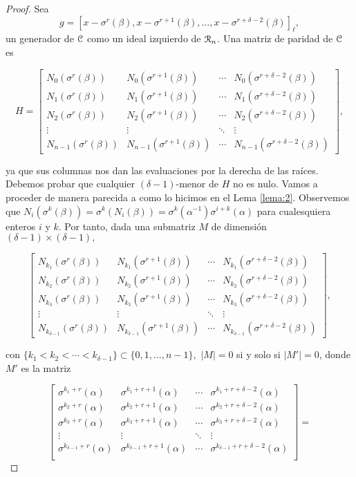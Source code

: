 \begin{proof}
Sea $$g = [x - \sigma^r(\beta), x - \sigma^{r+1}(\beta),\dots,x - \sigma^{r + \delta - 2}(\beta)]_\ell,$$
un generador de $\mathcal C$ como un ideal izquierdo de $\mathcal R_n$. Una matriz de paridad de $\mathcal C$ es

\[ H = 
\begin{bmatrix}
N_0(\sigma^r(\beta)) & N_0(\sigma^{r+1}(\beta)) & \cdots & N_0(\sigma^{r+\delta-2}(\beta)) \\
N_1(\sigma^r(\beta)) & N_1(\sigma^{r+1}(\beta)) & \cdots & N_1(\sigma^{r+\delta-2}(\beta)) \\
N_2(\sigma^r(\beta)) & N_2(\sigma^{r+1}(\beta)) & \cdots & N_2(\sigma^{r+\delta-2}(\beta)) \\
\vdots & \vdots & \ddots & \vdots \\
N_{n-1}(\sigma^r(\beta)) & N_{n-1}(\sigma^{r+1}(\beta)) & \cdots & N_{n-1}(\sigma^{r+\delta-2}(\beta))
\end{bmatrix},
\]

ya que sus columnas nos dan las evaluaciones por la derecha de las raíces. Debemos probar que cualquier $(\delta - 1)$-menor de $H$ no es nulo. Vamos a proceder de manera parecida a como lo hicimos en el Lema \ref{lema:2}. Observemos que $N_i(\sigma^k(\beta)) = \sigma^k(N_i(\beta)) = \sigma^k(\alpha^{-1})\sigma^{i+k}(\alpha)$ para cualesquiera enteros $i$ y $k$. Por tanto, dada una submatriz $M$ de dimensión $(\delta - 1)\times(\delta - 1),$

\[
\begin{bmatrix}
N_{k_1}(\sigma^r(\beta)) & N_{k_1}(\sigma^{r+1}(\beta)) & \cdots & N_{k_1}(\sigma^{r+\delta-2}(\beta)) \\
N_{k_2}(\sigma^r(\beta)) & N_{k_2}(\sigma^{r+1}(\beta)) & \cdots & N_{k_2}(\sigma^{r+\delta-2}(\beta)) \\
N_{k_3}(\sigma^r(\beta)) & N_{k_3}(\sigma^{r+1}(\beta)) & \cdots & N_{k_3}(\sigma^{r+\delta-2}(\beta)) \\
\vdots & \vdots & \ddots & \vdots \\
N_{k_{\delta-1}}(\sigma^r(\beta)) & N_{k_{\delta-1}}(\sigma^{r+1}(\beta)) & \cdots & N_{k_{\delta-1}}(\sigma^{r+\delta-2}(\beta))
\end{bmatrix},
\]

con $\{k_1 < k_2 < \cdots < k_{\delta-1}\} \subset \{0,1,\dots,n-1\},$ $|M| = 0$ si y solo si $|M'| = 0$, donde $M'$ es la matriz

\[
\begin{bmatrix}
\sigma^{k_1 + r}(\alpha) & \sigma^{k_1 + r + 1}(\alpha) & \cdots & \sigma^{k_1 + r + \delta - 2}(\alpha) \\
\sigma^{k_2 + r}(\alpha) & \sigma^{k_2 + r + 1}(\alpha) & \cdots & \sigma^{k_2 + r + \delta - 2}(\alpha) \\
\sigma^{k_3 + r}(\alpha) & \sigma^{k_3 + r + 1}(\alpha) & \cdots & \sigma^{k_3 + r + \delta - 2}(\alpha) \\
\vdots & \vdots & \ddots & \vdots \\
\sigma^{k_{\delta - 1} + r}(\alpha) & \sigma^{k_{\delta - 1} + r + 1}(\alpha) & \cdots & \sigma^{k_{\delta - 1} + r + \delta - 2}(\alpha) \\
\end{bmatrix} =
\] 


\end{proof}
